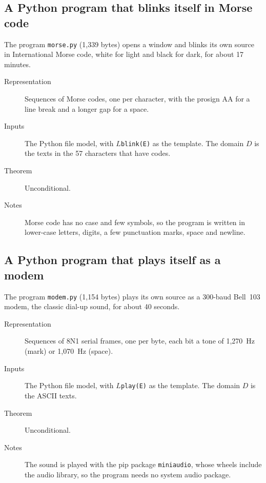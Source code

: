 \documentclass[11pt]{amsart}
\theoremstyle{definition}
\theoremstyle{remark}
\newcommand{\lean}[1]{\texttt{#1}}
\begin{document}
\subsection{A Python program that blinks itself in Morse code}
The program \lean{morse.py} (1,339 bytes) opens a window and blinks its own source in International
Morse code, white for light and black for dark, for about 17 minutes.
\begin{description}
\item[Representation] Sequences of Morse codes, one per character, with the prosign AA for a line
break and a longer gap for a space.
\item[Inputs] The Python file model, with $L$\verb|blink(E)| as the template. The domain $D$ is
the texts in
the 57 characters that have codes.
\item[Theorem] Unconditional.
\item[Notes] Morse code has no case and few symbols, so the program is written in lower-case
letters, digits, a few punctuation marks, space and newline.
\end{description}

\subsection{A Python program that plays itself as a modem}
The program \lean{modem.py} (1,154 bytes) plays its own source as a 300-baud Bell~103 modem, the
classic dial-up sound, for about 40 seconds.
\begin{description}
\item[Representation] Sequences of 8N1 serial frames, one per byte, each bit a tone of 1,270~Hz
(mark) or 1,070~Hz (space).
\item[Inputs] The Python file model, with $L$\verb|play(E)| as the template. The domain $D$ is
the ASCII
texts.
\item[Theorem] Unconditional.
\item[Notes] The sound is played with the pip package \verb|miniaudio|, whose wheels include the
audio library, so the program needs no system audio package.
\end{description}
\end{document}
